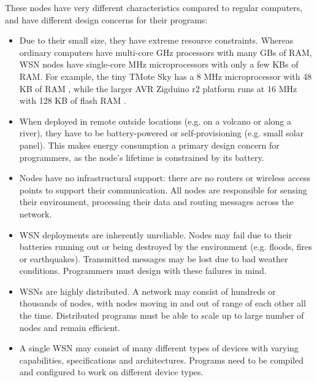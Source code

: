 These nodes have very different characteristics compared to regular computers, and have different design concerns for their programs:
\begin{itemize}
\item Due to their small size, they have extreme resource constraints. Whereas ordinary computers have multi-core \gls{GHz} processors with many \glspl{GB} of RAM, \gls{WSN} nodes have single-core \gls{MHz} microprocessors with only a few \glspl{KB} of RAM. For example, the tiny TMote Sky has a 8 \gls{MHz} microprocessor with 48 \gls{KB} of \gls{RAM} \cite{tmote-sky-manual}, while the larger AVR Zigduino r2 platform runs at 16 \gls{MHz} with 128 \gls{KB} of flash \gls{RAM} \cite{zigduino-manual}.
\item When deployed in remote outside locations (e.g. on a volcano or along a river), they have to be battery-powered or self-provisioning (e.g. small solar panel). This makes energy consumption a primary design concern for programmers, as the node's lifetime is constrained by its battery.
\item Nodes have no infrastructural support: there are no routers or wireless access points to support their communication. All nodes are responsible for sensing their environment, processing their data and routing messages across the network.
\item \gls{WSN} deployments are inherently unreliable. Nodes may fail due to their batteries running out or being destroyed by the environment (e.g. floods, fires or earthquakes). Transmitted messages may be lost due to bad weather conditions. Programmers must design with these failures in mind.
\item \glspl{WSN} are highly distributed. A network may consist of hundreds or thousands of nodes, with nodes moving in and out of range of each other all the time. Distributed programs must be able to scale up to large number of nodes and remain efficient.
\item A single \gls{WSN} may consist of many different types of devices with varying capabilities, specifications and architectures. Programs need to be compiled and configured to work on different device types.
\end{itemize}


